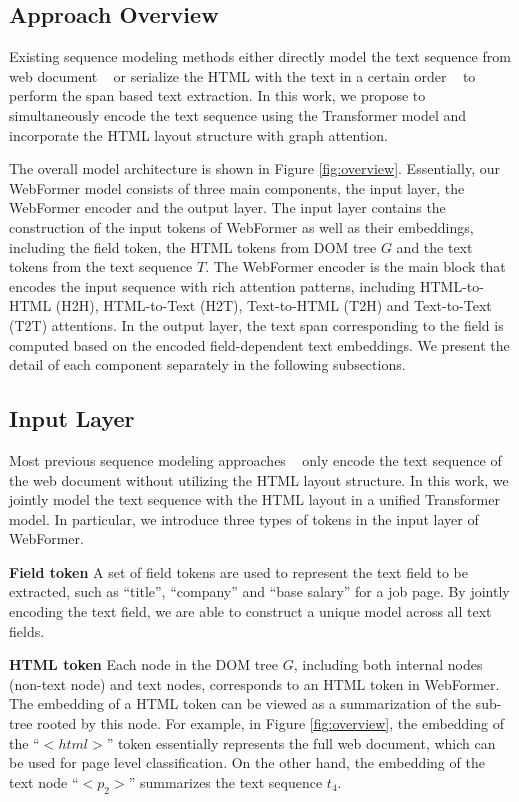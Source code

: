 \documentclass[sigconf]{acmart}
\begin{document}
\subsection{Approach Overview}
Existing sequence modeling methods either directly model the text sequence from web document ~\cite{Lin0VT20,WangYKSSSYE20} or serialize the HTML with the text in a certain order ~\cite{abs-2101-09465,abs-2101-02415} to perform the span based text extraction. In this work, we propose to simultaneously encode the text sequence using the Transformer model and incorporate the HTML layout structure with graph attention.

The overall model architecture is shown in Figure \ref{fig:overview}. Essentially, our WebFormer model consists of three main components, the input layer, the WebFormer encoder and the output layer.
The input layer contains the construction of the input tokens of WebFormer as well as their embeddings, including the field token, the HTML tokens from DOM tree $G$ and the text tokens from the text sequence $T$.
The WebFormer encoder is the main block that encodes the input sequence with rich attention patterns, including HTML-to-HTML (H2H), HTML-to-Text (H2T), Text-to-HTML (T2H) and Text-to-Text (T2T) attentions.
In the output layer, the text span corresponding to the field is computed based on the encoded field-dependent text embeddings.
We present the detail of each component separately in the following subsections.

\subsection{Input Layer}
Most previous sequence modeling approaches ~\cite{AggarwalGSK20,Amazon2} only encode the text sequence of the web document without utilizing the HTML layout structure.
In this work, we jointly model the text sequence with the HTML layout in a unified Transformer model. In particular, we introduce three types of tokens in the input layer of WebFormer.

\noindent\textbf{Field token} A set of field tokens are used to represent the text field to be extracted, such as ``title'', ``company'' and ``base salary'' for a job page. By jointly encoding the text field, we are able to construct a unique model across all text fields.

\noindent\textbf{HTML token} Each node in the DOM tree $G$, including both internal nodes (non-text node) and text nodes, corresponds to an HTML token in WebFormer. The embedding of a HTML token can be viewed as a summarization of the sub-tree rooted by this node. For example, in Figure \ref{fig:overview}, the embedding of the ``$<$$html$$>$'' token essentially represents the full web document, which can be used for page level classification. On the other hand, the embedding of the text node ``$<$$p_2$$>$'' summarizes the text sequence $t_4$.
\end{document}

